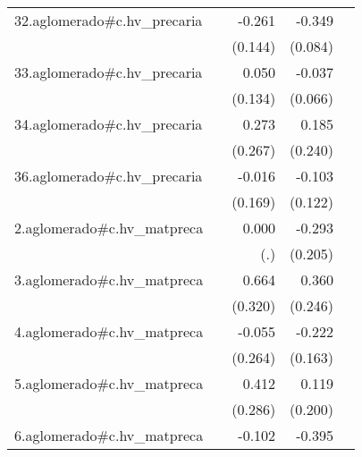 {\begin{longtable}{l*{4}{D{.}{.}{-1}}}
\addlinespace
32.aglomerado#c.hv\_precaria&                     &      -0.261         &      -0.349\sym{***}&                     \\
            &                     &     (0.144)         &     (0.084)         &                     \\
\addlinespace
33.aglomerado#c.hv\_precaria&                     &       0.050         &      -0.037         &                     \\
            &                     &     (0.134)         &     (0.066)         &                     \\
\addlinespace
34.aglomerado#c.hv\_precaria&                     &       0.273         &       0.185         &                     \\
            &                     &     (0.267)         &     (0.240)         &                     \\
\addlinespace
36.aglomerado#c.hv\_precaria&                     &      -0.016         &      -0.103         &                     \\
            &                     &     (0.169)         &     (0.122)         &                     \\
\addlinespace
2.aglomerado#c.hv\_matpreca&                     &       0.000         &      -0.293         &                     \\
            &                     &         (.)         &     (0.205)         &                     \\
\addlinespace
3.aglomerado#c.hv\_matpreca&                     &       0.664\sym{*}  &       0.360         &                     \\
            &                     &     (0.320)         &     (0.246)         &                     \\
\addlinespace
4.aglomerado#c.hv\_matpreca&                     &      -0.055         &      -0.222         &                     \\
            &                     &     (0.264)         &     (0.163)         &                     \\
\addlinespace
5.aglomerado#c.hv\_matpreca&                     &       0.412         &       0.119         &                     \\
            &                     &     (0.286)         &     (0.200)         &                     \\
\addlinespace
6.aglomerado#c.hv\_matpreca&                     &      -0.102         &      -0.395         &                     \\

\end{longtable}}
